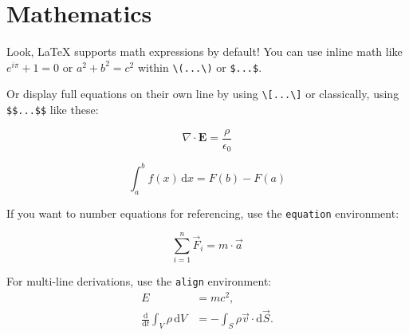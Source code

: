\section{Mathematics}

Look, {\LaTeX} supports math expressions by default!
You can use inline math like \( e^{i\pi} + 1 = 0 \) or \( a^2 + b^2 = c^2 \) within \texttt{\textbackslash(...\textbackslash)} or \texttt{\$...\$}.

Or display full equations on their own line by using \texttt{\textbackslash[...\textbackslash]} or classically, using \texttt{\$\$...\$\$} like these:

\[
  \nabla \cdot \mathbf{E} = \frac{\rho}{\epsilon_0}
\]

$$
  \int_{a}^{b} f(x) \, \mathrm{d}x = F(b) - F(a)
$$

If you want to number equations for referencing, use the \texttt{equation} environment:

\begin{equation}
  \label{eq:newton}
  \sum_{i=1}^{n} \vec{F}_i = m \cdot \vec{a}
\end{equation}

For multi-line derivations, use the \texttt{align} environment:
\begin{align}
  E &= mc^2, \\
  \frac{\mathrm{d}}{\mathrm{d}t} \int_{V} \rho \, \mathrm{d}V &= - \int_{S} \rho \vec{v} \cdot \mathrm{d}\vec{S}.
\end{align}
